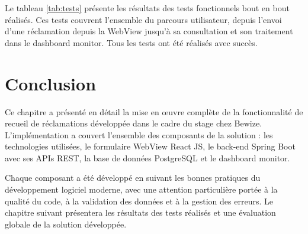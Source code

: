 Le tableau \ref{tab:tests} présente les résultats des tests 
fonctionnels bout en bout réalisés. Ces tests couvrent l'ensemble 
du parcours utilisateur, depuis l'envoi d'une réclamation depuis 
la WebView jusqu'à sa consultation et son traitement dans le 
dashboard monitor. Tous les tests ont été réalisés avec succès.

\section{Conclusion}

Ce chapitre a présenté en détail la mise en œuvre complète de la 
fonctionnalité de recueil de réclamations développée dans le cadre 
du stage chez Bewize. L'implémentation a couvert l'ensemble des 
composants de la solution : les technologies utilisées, le formulaire 
WebView React JS, le back-end Spring Boot avec ses APIs REST, la base 
de données PostgreSQL et le dashboard monitor.

Chaque composant a été développé en suivant les bonnes pratiques du 
développement logiciel moderne, avec une attention particulière portée 
à la qualité du code, à la validation des données et à la gestion des 
erreurs. Le chapitre suivant présentera les résultats des tests 
réalisés et une évaluation globale de la solution développée.
